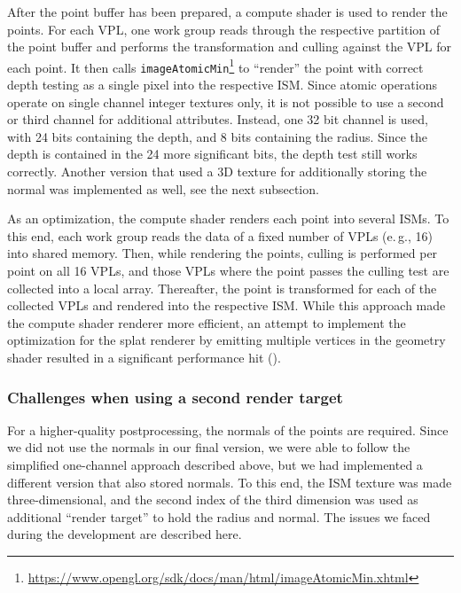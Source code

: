 After the point buffer has been prepared, a compute shader is used to render the points. For each VPL, one work group reads through the respective partition of the point buffer and performs the transformation and culling against the VPL for each point. It then calls \texttt{imageAtomicMin}\footnote{\url{https://www.opengl.org/sdk/docs/man/html/imageAtomicMin.xhtml}} to ``render'' the point with correct depth testing as a single pixel into the respective ISM. Since atomic operations operate on single channel integer textures only, it is not possible to use a second or third channel for additional attributes. Instead, one 32 bit channel is used, with 24 bits containing the depth, and 8 bits containing the radius. Since the depth is contained in the 24 more significant bits, the depth test still works correctly. Another version that used a 3D texture for additionally storing the normal was implemented as well, see the next subsection.

As an optimization, the compute shader renders each point into several ISMs. To this end, each work group reads the data of a fixed number of VPLs (e.\,g., 16) into shared memory. Then, while rendering the points, culling is performed per point on all 16 VPLs, and those VPLs where the point passes the culling test are collected into a local array. Thereafter, the point is transformed for each of the collected VPLs and rendered into the respective ISM. While this approach made the compute shader renderer more efficient, an attempt to implement the optimization for the splat renderer by emitting multiple vertices in the geometry shader resulted in a significant performance hit ().


\subsubsection{Challenges when using a second render target}
\label{sec:impl:raceCondition}

For a higher-quality postprocessing, the normals of the points are required. Since we did not use the normals in our final version, we were able to follow the simplified one-channel approach described above, but we had implemented a different version that also stored normals. To this end, the ISM texture was made three-dimensional, and the second index of the third dimension was used as additional ``render target'' to hold the radius and normal. The issues we faced during the development are described here.

